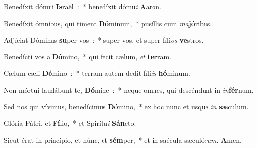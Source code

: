 \item Benedíxit dómui \textbf{Is}raël~:~* benedíxit dómu\emph{i} \textbf{A}aron.
\item Benedíxit ómnibus, qui timent \textbf{Dó}minum,~* pusíllis cum \emph{ma}\textbf{jó}ribus.
\item Adjíciat Dóminus \textbf{su}per vos~:~* super vos, et super fíli\emph{os} \textbf{ve}stros.
\item Benedícti vos a \textbf{Dó}mino,~* qui fecit cælum, \emph{et} \textbf{ter}ram.
\item Cælum cæli \textbf{Dó}mino~:~* terram autem dedit fíli\emph{is} \textbf{hó}\-mi\-num.
\item Non mórtui laudábunt te, \textbf{Dó}mine~:~* neque omnes, qui descéndunt in \emph{in}\textbf{fér}num.
\item Sed nos qui vívimus, benedícimus \textbf{Dó}mino,~* ex hoc nunc et usque \emph{in} \textbf{sæ}culum.
\item Glória Pátri, et \textbf{Fí}lio,~* et Spirítu\emph{i} \textbf{Sán}cto.
\item Sicut érat in princípio, et núnc, et \textbf{sém}per,~* et in saécula sæculó\emph{rum}. \textbf{A}men.